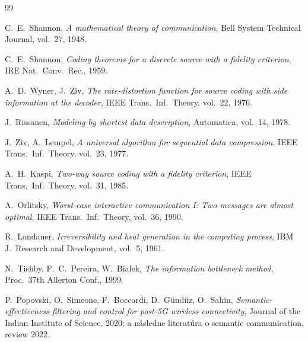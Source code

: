 \documentclass[11pt,a4paper]{article}
\begin{document}

\begin{thebibliography}{99}

C.~E.~Shannon, \emph{A mathematical theory of communication},
Bell System Technical Journal, vol.~27, 1948.

C.~E.~Shannon, \emph{Coding theorems for a discrete source with
a fidelity criterion}, IRE Nat.\ Conv.\ Rec., 1959.

A.~D.~Wyner, J.~Ziv, \emph{The rate-distortion function for source
coding with side information at the decoder}, IEEE Trans.\ Inf.\ Theory,
vol.~22, 1976.

J.~Rissanen, \emph{Modeling by shortest data description},
Automatica, vol.~14, 1978.

J.~Ziv, A.~Lempel, \emph{A universal algorithm for sequential data
compression}, IEEE Trans.\ Inf.\ Theory, vol.~23, 1977.

A.~H.~Kaspi, \emph{Two-way source coding with a fidelity criterion},
IEEE Trans.\ Inf.\ Theory, vol.~31, 1985.

A.~Orlitsky, \emph{Worst-case interactive communication I: Two
messages are almost optimal}, IEEE Trans.\ Inf.\ Theory, vol.~36, 1990.

R.~Landauer, \emph{Irreversibility and heat generation in the
computing process}, IBM J.\ Research and Development, vol.~5, 1961.

N.~Tishby, F.~C.~Pereira, W.~Bialek, \emph{The information bottleneck
method}, Proc.\ 37th Allerton Conf., 1999.

P.~Popovski, O.~Simeone, F.~Boccardi, D.~Gündüz, O.~Sahin,
\emph{Semantic-effectiveness filtering and control for post-5G
wireless connectivity}, Journal of the Indian Institute of Science,
2020; a následne literatúra o semantic communication, review 2022.

\end{thebibliography}
\end{document}
